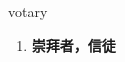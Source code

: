 
\begin{frame}
{\huge votary}
\begin{center}
\begin{enumerate}\Large
  \item \textbf{崇拜者，信徒}
\end{enumerate}
\end{center}
\end{frame}
